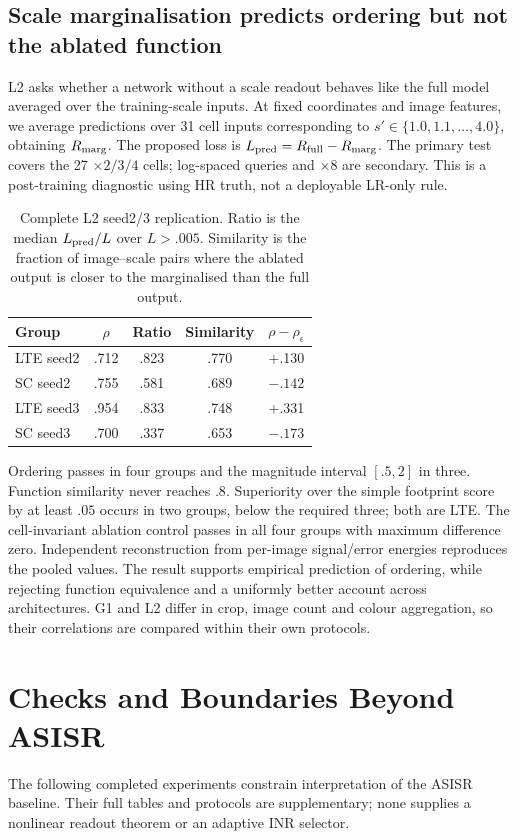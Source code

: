 \subsection{Scale marginalisation predicts ordering but not the ablated function}\label{sec:l2-main}
L2 asks whether a network without a scale readout behaves like the full model averaged over the training-scale inputs. At fixed coordinates and image features, we average predictions over 31 cell inputs corresponding to $s'\in\{1.0,1.1,\ldots,4.0\}$, obtaining $R_{\rm marg}$. The proposed loss is $L_{\rm pred}=R_{\rm full}-R_{\rm marg}$. The primary test covers the 27 $\times2/3/4$ cells; log-spaced queries and $\times8$ are secondary. This is a post-training diagnostic using HR truth, not a deployable LR-only rule.

\begin{table}[t]\centering\small
\caption{Complete L2 seed2/3 replication. Ratio is the median $L_{\rm pred}/L$ over $L>.005$. Similarity is the fraction of image--scale pairs where the ablated output is closer to the marginalised than the full output.}\label{tab:l2-main}
\begin{tabular}{lcccc}\toprule
Group & $\rho$ & Ratio & Similarity & $\rho-\rho_\epsilon$\\\midrule
LTE seed2 & .712 & .823 & .770 & +.130\\
SC seed2 & .755 & .581 & .689 & $-.142$\\
LTE seed3 & .954 & .833 & .748 & +.331\\
SC seed3 & .700 & .337 & .653 & $-.173$\\\bottomrule
\end{tabular}
\end{table}
Ordering passes in four groups and the magnitude interval $[.5,2]$ in three. Function similarity never reaches $.8$. Superiority over the simple footprint score by at least $.05$ occurs in two groups, below the required three; both are LTE. The cell-invariant ablation control passes in all four groups with maximum difference zero. Independent reconstruction from per-image signal/error energies reproduces the pooled values. The result supports empirical prediction of ordering, while rejecting function equivalence and a uniformly better account across architectures. G1 and L2 differ in crop, image count and colour aggregation, so their correlations are compared within their own protocols.

\section{Checks and Boundaries Beyond ASISR}\label{sec:boundary}
The following completed experiments constrain interpretation of the ASISR baseline. Their full tables and protocols are supplementary; none supplies a nonlinear readout theorem or an adaptive INR selector.

